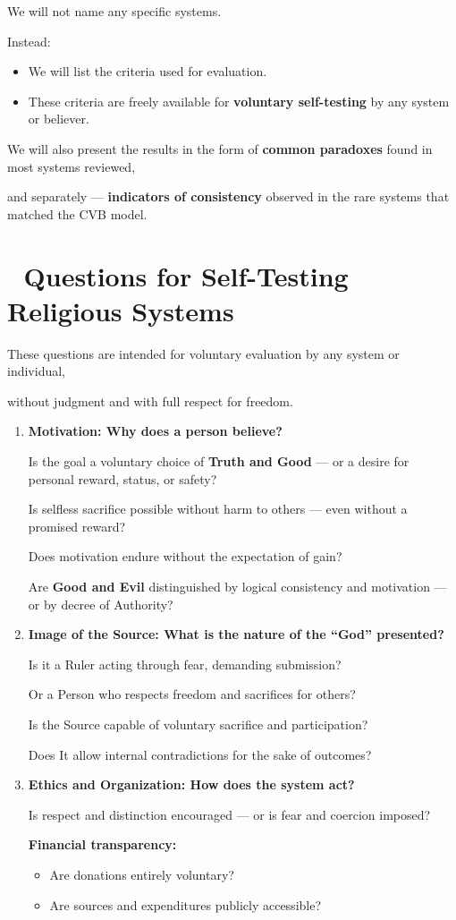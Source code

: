\documentclass[12pt]{article}
\begin{document}
We will not name any specific systems.

Instead:

\begin{itemize}
\item We will list the criteria used for evaluation.
\item These criteria are freely available for \textbf{voluntary self-testing} by any system or believer.
\end{itemize}

We will also present the results in the form of \textbf{common paradoxes} found in most systems reviewed,

and separately — \textbf{indicators of consistency} observed in the rare systems that matched the CVB model.


\section*{🔷 Questions for Self-Testing Religious Systems}

These questions are intended for voluntary evaluation by any system or individual,

without judgment and with full respect for freedom.

\begin{enumerate}
\item \textbf{Motivation: Why does a person believe?}

Is the goal a voluntary choice of \textbf{Truth and Good} — or a desire for personal reward, status, or safety?

Is selfless sacrifice possible without harm to others — even without a promised reward?

Does motivation endure without the expectation of gain?

Are \textbf{Good and Evil} distinguished by logical consistency and motivation — or by decree of Authority?

\item \textbf{Image of the Source: What is the nature of the ``God'' presented?}

Is it a Ruler acting through fear, demanding submission?

Or a Person who respects freedom and sacrifices for others?

Is the Source capable of voluntary sacrifice and participation?

Does It allow internal contradictions for the sake of outcomes?

\item \textbf{Ethics and Organization: How does the system act?}

Is respect and distinction encouraged — or is fear and coercion imposed?

\textbf{Financial transparency:}

\begin{itemize}
\item Are donations entirely voluntary?
\item Are sources and expenditures publicly accessible?
\end{itemize}
\end{enumerate}
\end{document}
